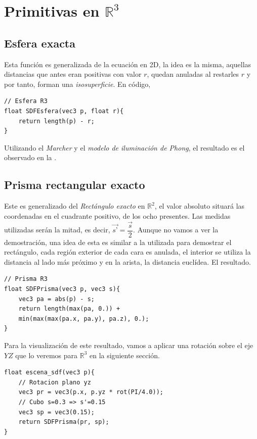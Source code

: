 \section{Primitivas en \(\mathbb{R}^3\)}

\subsection{Esfera exacta}
Esta función es generalizada de la ecuación en 2D, la idea es la misma, aquellas distancias que antes eran positivas con valor \(r\), quedan anuladas al restarles \(r\) y por tanto, forman una \textit{isosuperficie}. En código,
\begin{lstlisting}
// Esfera R3
float SDFEsfera(vec3 p, float r){
    return length(p) - r;
}
\end{lstlisting}
Utilizando el \textit{Marcher} y el \textit{modelo de iluminación de Phong}, el resultado es el observado en la .

\subsection{Prisma rectangular exacto}
Este es generalizado del \textit{Rectángulo exacto} en \(\mathbb{R}^2\), el valor absoluto situará las coordenadas en el cuadrante positivo, de los ocho presentes. Las medidas utilizadas serán la mitad, es decir, \(\Vec{s’}= \dfrac{\Vec{s}}{2}\). Aunque no vamos a ver la demostración, una idea de esta es similar a la utilizada para demostrar el rectángulo, cada región exterior de cada cara es anulada, el interior se utiliza la distancia al lado más próximo y en la arista, la distancia euclídea. El resultado.

\begin{lstlisting}
// Prisma R3
float SDFPrisma(vec3 p, vec3 s){
    vec3 pa = abs(p) - s;
    return length(max(pa, 0.)) +
    min(max(max(pa.x, pa.y), pa.z), 0.);
}
\end{lstlisting}

Para la visualización de este resultado, vamos a aplicar una rotación sobre el eje \(YZ\) que lo veremos para \(\mathbb{R}^3\) en la siguiente sección.

\begin{lstlisting}
float escena_sdf(vec3 p){
    // Rotacion plano yz
    vec3 pr = vec3(p.x, p.yz * rot(PI/4.0));
    // Cubo s=0.3 => s'=0.15
    vec3 sp = vec3(0.15);
    return SDFPrisma(pr, sp);
}
\end{lstlisting}

